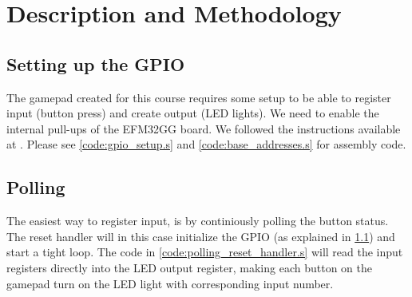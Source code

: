 \section{Description and Methodology}
\subsection{Setting up the GPIO}\label{subsection:gpio_setup}
The gamepad created for this course requires some setup to be able to register input (button press) and create output (LED lights). We need to enable the internal pull-ups of the EFM32GG board. We followed the instructions available at \cite[p. 24]{compendium}. Please see \ref{code:gpio_setup.s} and \ref{code:base_addresses.s} for assembly code.

	\subsection{Polling}
	The easiest way to register input, is by continiously polling the button status. The reset handler will in this case initialize the GPIO (as explained in \ref{subsection:gpio_setup}) and start a tight loop.
	The code in \ref{code:polling_reset_handler.s} will read the input registers directly into the LED output register, making each button on the gamepad turn on the LED light with corresponding input number.
	
